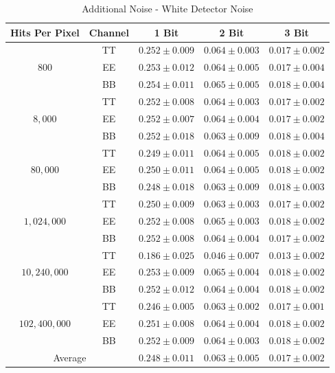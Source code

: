 \documentclass[apj]{emulateapj}
\begin{document}
\def\arraystretch{1.3}
\begin{table}[tbh]
\begin{center}
\caption{\label{tab:extranoisewhite} Additional Noise - White Detector Noise}
\small
\begin{tabular}{c c c c c}
Hits Per Pixel & Channel & 1 Bit & 2 Bit & 3 Bit \\
\hline
\hline
\multirow{3}{*}{$800$}  & TT  & $ 0.252 \pm 0.009 $  & $ 0.064 \pm 0.003 $  & $ 0.017 \pm 0.002 $ \\
& EE  & $ 0.253 \pm 0.012 $  & $ 0.064 \pm 0.005 $  & $ 0.017 \pm 0.004 $ \\
& BB  & $ 0.254 \pm 0.011 $  & $ 0.065 \pm 0.005 $  & $ 0.018 \pm 0.004 $ \\
\hline
\multirow{3}{*}{$8,000$}  & TT  & $ 0.252 \pm 0.008 $  & $ 0.064 \pm 0.003 $  & $ 0.017 \pm 0.002 $ \\
& EE  & $ 0.252 \pm 0.007 $  & $ 0.064 \pm 0.004 $  & $ 0.017 \pm 0.002 $ \\
& BB  & $ 0.252 \pm 0.018 $  & $ 0.063 \pm 0.009 $  & $ 0.018 \pm 0.004 $ \\
\hline
\multirow{3}{*}{$80,000$}  & TT  & $ 0.249 \pm 0.011 $  & $ 0.064 \pm 0.005 $  & $ 0.018 \pm 0.002 $ \\
& EE  & $ 0.250 \pm 0.011 $  & $ 0.064 \pm 0.005 $  & $ 0.018 \pm 0.002 $ \\
& BB  & $ 0.248 \pm 0.018 $  & $ 0.063 \pm 0.009 $  & $ 0.018 \pm 0.003 $ \\
\hline
\multirow{3}{*}{$1,024,000$}  & TT  & $ 0.250 \pm 0.009 $  & $ 0.063 \pm 0.003 $  & $ 0.017 \pm 0.002 $ \\
& EE  & $ 0.252 \pm 0.008 $  & $ 0.065 \pm 0.003 $  & $ 0.018 \pm 0.002 $ \\
& BB  & $ 0.252 \pm 0.008 $  & $ 0.064 \pm 0.004 $  & $ 0.017 \pm 0.002 $ \\
\hline
\multirow{3}{*}{$10,240,000$}  & TT  & $ 0.186 \pm 0.025 $  & $ 0.046 \pm 0.007 $  & $ 0.013 \pm 0.002 $ \\
& EE  & $ 0.253 \pm 0.009 $  & $ 0.065 \pm 0.004 $  & $ 0.018 \pm 0.002 $ \\
& BB  & $ 0.252 \pm 0.012 $  & $ 0.064 \pm 0.004 $  & $ 0.018 \pm 0.002 $ \\
\hline
\multirow{3}{*}{$102,400,000$}  & TT  & $ 0.246 \pm 0.005 $  & $ 0.063 \pm 0.002 $  & $ 0.017 \pm 0.001 $ \\
& EE  & $ 0.251 \pm 0.008 $  & $ 0.064 \pm 0.004 $  & $ 0.018 \pm 0.002 $ \\
& BB  & $ 0.252 \pm 0.009 $  & $ 0.064 \pm 0.003 $  & $ 0.018 \pm 0.002 $ \\
\hline
\multicolumn{2}{c}{Average}  & $ 0.248 \pm 0.011 $  & $ 0.063 \pm 0.005 $  & $ 0.017 \pm 0.002 $ \\
\end{tabular}
 \normalsize
\end{center}
\end{table}
\end{document}
